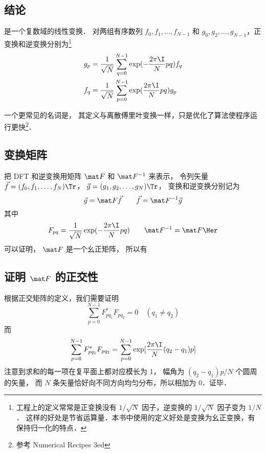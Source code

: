 
\subsection{结论}

是一个复数域的线性变换． 对两组有序数列 $f_0, f_1, \dots, f_{N-1}$ 和 $g_0,g_2,\dots, g_{N-1}$，正变换和逆变换分别为\footnote{工程上的定义常常是正变换没有 $1/\sqrt{N}$ 因子，逆变换的 $1/\sqrt{N}$ 因子变为 $1/N$． 这样的好处是节省运算量．本书中使用的定义好处是变换为幺正变换，有保持归一化的特点．}
\begin{align}
g_p &= \frac{1}{\sqrt{N}}\sum_{q=0}^{N-1} \exp(-\frac{2\pi\I}{N} p q ) f_q \\
f_q &= \frac{1}{\sqrt{N}}\sum_{p=0}^{N-1} \exp(\frac{2\pi\I}{N} p q) g_p
\end{align}

一个更常见的名词是， 其定义与离散傅里叶变换一样，只是优化了算法使程序运行更快\footnote{参考 Numerical Recipes 3ed}．

\subsection{变换矩阵}
把 DFT 和逆变换用矩阵%
 $\mat F$ 和 $\mat F^{-1}$ 来表示， 令列矢量 $\vec f = (f_0,f_1,\dots,f_N)\Tr$， $\vec g = (g_1,g_2,\dots,g_N)\Tr$， 变换和逆变换分别记为
\begin{equation}
\vec g = \mat F \vec f \qquad
\vec f = \mat F^{-1} \vec g
\end{equation}
其中
\begin{equation}
F_{pq} = \frac{1}{\sqrt{N}} \exp(-\frac{2\pi\I}{N} p q) \qquad
\mat F^{-1} = \mat F\Her
\end{equation}
可以证明， $\mat F$ 是一个幺正矩阵， 所以有

\subsection{证明 $\mat F$ 的正交性}
根据正交矩阵的定义，我们需要证明
\begin{equation}
\sum_{p=0}^{N-1} F^*_{pq_1} F_{pq_2} = 0 \quad (q_1 \ne q_2)
\end{equation}
而
\begin{equation}\label{DFT_eq1}
\sum_{p=0}^{N-1} F^*_{pq_1}F_{pq_2}
= \sum_{p=0}^{N-1} \exp[\frac{2\pi\I}{N} (q_2-q_1) p]
\end{equation}
注意到求和的每一项在复平面上都对应模长为 1， 幅角为 $(q_2-q_1)p/N$ 个圆周的矢量，%
而 $N$ 条矢量恰好向不同方向均匀分布，所以相加为 $0$．证毕．

